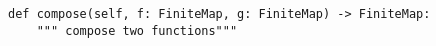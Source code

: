\begin{verbatim}
def compose(self, f: FiniteMap, g: FiniteMap) -> FiniteMap:
    """ compose two functions"""
\end{verbatim}